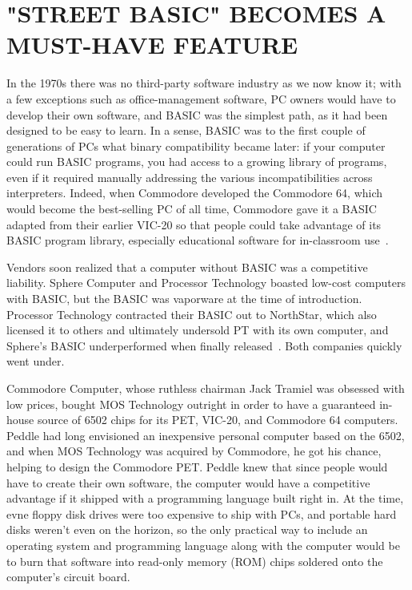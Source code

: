 
\section{"STREET BASIC" BECOMES A MUST-HAVE FEATURE}


In the 1970s there was no third-party software industry as we now know
it; with a few exceptions such as office-management software,
PC owners would have to develop their own software, and BASIC was the
simplest path, as it had been designed to be easy to learn.  In a sense,
BASIC was to the first couple of generations of PCs what binary
compatibility became later: if your computer could run BASIC programs,
you had access to a growing library of programs, even if it required
manually addressing the various incompatibilities across interpreters.
Indeed, when Commodore developed the Commodore 64, which would become
the best-selling 
PC of all time, Commodore gave it a BASIC adapted from
their earlier VIC-20 so that people could take advantage of its BASIC program
library, especially educational software for in-classroom
use~\cite[p. 414]{commodore}. 

Vendors soon realized that a computer without BASIC was a
competitive liability.  Sphere Computer and Processor Technology
boasted low-cost computers with BASIC, but the BASIC was
vaporware at the time of introduction.  Processor Technology 
contracted their BASIC out to NorthStar, which also licensed it to
others and ultimately undersold PT with its own computer,
and Sphere's BASIC underperformed when finally
released~\cite[p. 114, 134]{veit}.  Both companies quickly went under.

Commodore Computer, whose ruthless chairman Jack Tramiel was obsessed
with low prices, bought MOS Technology outright in order to have a
guaranteed in-house source of 6502 chips for its PET, VIC-20, and Commodore
64 computers.
Peddle had long envisioned an inexpensive personal computer based on
the 6502, and when MOS
Technology was acquired by Commodore, he got his chance, helping to
design the Commodore PET.
Peddle knew that since people would have to create their own software,
the computer would have a competitive advantage if it shipped with a
programming language built right in.  At the time, evne floppy disk
drives were too expensive to ship with PCs, and portable hard disks
weren't even on the horizon, so the only practical way to include an operating
system and programming language along with the computer would be to burn
that software into read-only memory
(ROM) chips soldered onto the computer's circuit board.

